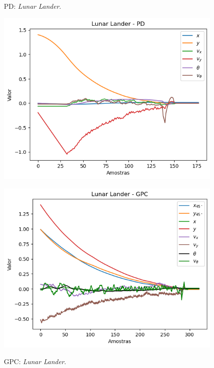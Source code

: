 \documentclass[12pt,           %
a4paper,                       %
openany,                       %
oneside,                       %
chapter=TITLE,                 %
english,                       %
spanish,                       %
brazil,                        %
sumario=tradicional]{abntex2}  %
\begin{document}
\begin{OnehalfSpace}
\begin{figure}[H]
  \begin{minipage}{0.5\textwidth}
    \centering
     \caption{PD: \textit{Lunar Lander}.}
     \includegraphics[scale=0.5]{llpid.png}
    \label{fig:llpid}
  \end{minipage}
  \begin{minipage}{0.5\textwidth}
    \centering
     \caption{GPC: \textit{Lunar Lander}.}
     \includegraphics[scale=0.5]{llgpc.png}
    \label{fig:imagem2}
  \end{minipage}
\end{figure}
\vspace*{-1.2cm}
{\raggedright {}}


\end{OnehalfSpace}
\end{document}
